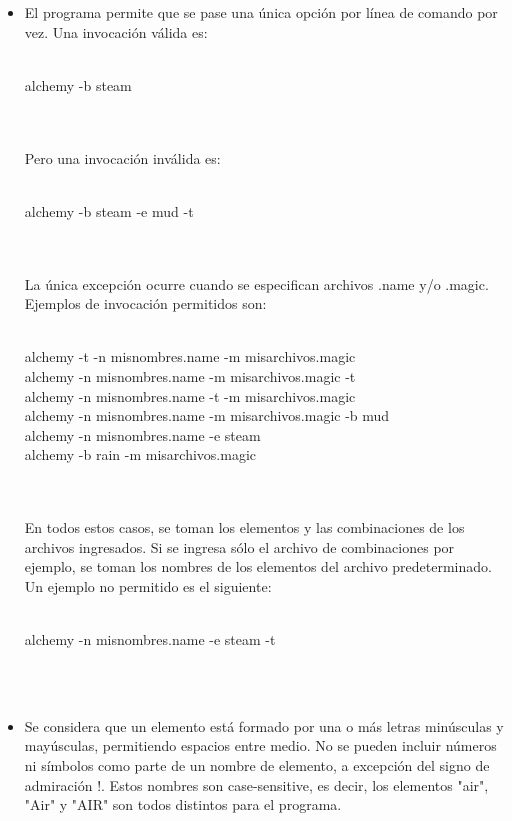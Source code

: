 \documentclass[a4paper, 10pt]{article}
\begin{document}
\begin{itemize}

\item El programa permite que se pase una única opción por línea de comando por vez. Una invocación válida es:
\\
\\\begin{tt}
alchemy -b steam
\end{tt}\\\\
Pero una invocación inválida es:
\\
\\\begin{tt}
alchemy -b steam -e mud -t
\end{tt}\\\\
La única excepción ocurre cuando se especifican archivos .name y/o .magic. Ejemplos de invocación permitidos son:
\\
\\\begin{tt}
alchemy -t -n misnombres.name -m misarchivos.magic\\
alchemy -n misnombres.name -m misarchivos.magic -t\\
alchemy -n misnombres.name -t -m misarchivos.magic\\
alchemy -n misnombres.name -m misarchivos.magic -b mud\\
alchemy -n misnombres.name -e steam\\
alchemy -b rain -m misarchivos.magic
\end{tt}\\\\
En todos estos casos, se toman los elementos y las combinaciones de los archivos ingresados. Si se ingresa sólo el archivo de combinaciones por ejemplo, se toman los nombres de los elementos del archivo predeterminado.\\
Un ejemplo no permitido es el siguiente:\\
\\\begin{tt}
alchemy -n misnombres.name -e steam -t\\
\end{tt}\\\\

\item Se considera que un elemento está formado por una o más letras minúsculas y mayúsculas, permitiendo espacios entre medio. No se pueden incluir números ni símbolos como parte de un nombre de elemento, a excepción del signo de admiración !. Estos nombres son case-sensitive, es decir, los elementos "air", "Air" y "AIR" son todos distintos para el programa.\\


\end{itemize}
\end{document}
